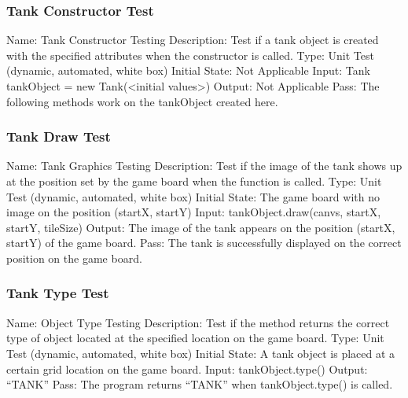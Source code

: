 \documentclass{article}
\begin{document}
\subsubsection{Tank Constructor Test}
Name: Tank Constructor Testing\newline
Description: Test if a tank object is created with the specified attributes when the constructor is called.\newline
Type: Unit Test (dynamic, automated, white box)\newline
Initial State: Not Applicable\newline
Input: Tank tankObject = new Tank(<initial values>)\newline
Output: Not Applicable \newline
Pass: The following methods work on the tankObject created here.\newline

\subsubsection{Tank Draw Test}
Name: Tank Graphics Testing\newline
Description: Test if the image of the tank shows up at the position set by the game board when the function is called.\newline
Type: Unit Test (dynamic, automated, white box)\newline
Initial State: The game board with no image on the position (startX, startY)\newline
Input: tankObject.draw(canvs, startX, startY, tileSize)\newline
Output: The image of the tank appears on the position (startX, startY) of the game board.\newline
Pass: The tank is successfully displayed on the correct position on the game board.\newline

\subsubsection{Tank Type Test}
Name: Object Type Testing\newline
Description: Test if the method returns the correct type of object located at the specified location on the game board.\newline
Type: Unit Test (dynamic, automated, white box)\newline
Initial State: A tank object is placed at a certain grid location on the game board.\newline
Input: tankObject.type()\newline
Output: “TANK”\newline
Pass: The program returns “TANK” when tankObject.type() is called.\newline
\end{document}
